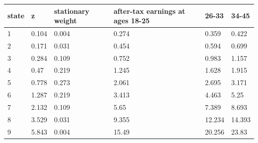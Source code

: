 \begingroup\small
\setlength{\tabcolsep}{3pt}
\renewcommand{\arraystretch}{1.04}
\begin{tabularx}{\linewidth}{XXXXXX}
\toprule
state & z & stationary weight & after-tax earnings at ages 18-25 & 26-33 & 34-45 \\
\midrule
1 & 0.104 & 0.004 & 0.274 & 0.359 & 0.422 \\
2 & 0.171 & 0.031 & 0.454 & 0.594 & 0.699 \\
3 & 0.284 & 0.109 & 0.752 & 0.983 & 1.157 \\
4 & 0.47 & 0.219 & 1.245 & 1.628 & 1.915 \\
5 & 0.778 & 0.273 & 2.061 & 2.695 & 3.171 \\
6 & 1.287 & 0.219 & 3.413 & 4.463 & 5.25 \\
7 & 2.132 & 0.109 & 5.65 & 7.389 & 8.693 \\
8 & 3.529 & 0.031 & 9.355 & 12.234 & 14.393 \\
9 & 5.843 & 0.004 & 15.49 & 20.256 & 23.83 \\
\bottomrule
\end{tabularx}
\endgroup
